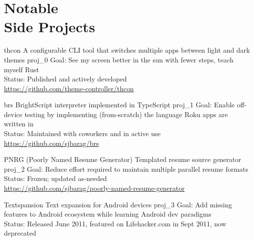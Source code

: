 \documentclass[10pt]{barag_resume}
\begin{document}
    \newpage %
\section{Notable\\ Side Projects}\relax
    \begin{project}
        {thcon}
        {A configurable CLI tool that switches multiple apps between light and dark themes}
        {proj_0}
            Goal: See my screen better in the sun with fewer steps, teach myself Rust\\
            Status: Published and actively developed \\ 
            \url{https://github.com/theme-controller/thcon}
    \end{project}

    \begin{project}
        {brs}
        {BrightScript interpreter implemented in TypeScript}
        {proj_1}
            Goal: Enable off-device testing by implementing (from-scratch) the language Roku apps are written in\\
            Status: Maintained with coworkers and in active use \\ 
            \url{https://github.com/sjbarag/brs}
    \end{project}

    \begin{project}
        {PNRG (Poorly Named Resume Generator)}
        {Templated resume source generator}
        {proj_2}
            Goal: Reduce effort required to maintain multiple parallel resume formats\\
            Status: Frozen; updated as-needed \\ 
            \url{https://github.com/sjbarag/poorly-named-resume-generator}
    \end{project}

    \begin{project}
        {Textspansion}
        {Text expansion for Android devices}
        {proj_3}
            Goal: Add missing features to Android ecosystem while learning Android dev paradigms\\
            Status: Released June 2011, featured on Lifehacker.com in Sept 2011, now deprecated    \end{project}
\end{document}
